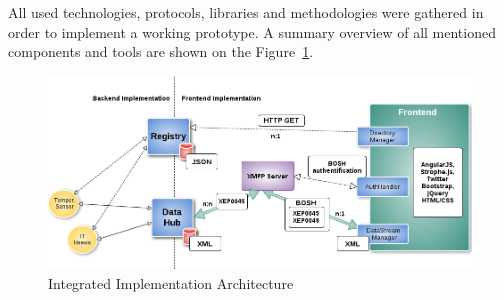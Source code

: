 All used technologies, protocols, libraries and methodologies were gathered in order to implement a working prototype. A summary overview of all mentioned components and tools are shown on the Figure~\ref{img:summary}.

\begin{figure}[H]
\centering
\includegraphics[scale=0.5]{images/ch5Summary.png}   
\caption[Implementation Architecture]{Integrated Implementation Architecture}  
\label{img:summary}                       
\end{figure}

